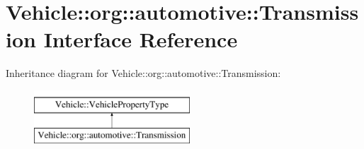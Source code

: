 \hypertarget{interfaceVehicle_1_1org_1_1automotive_1_1Transmission}{\section{Vehicle\-:\-:org\-:\-:automotive\-:\-:Transmission Interface Reference}
\label{interfaceVehicle_1_1org_1_1automotive_1_1Transmission}
}
Inheritance diagram for Vehicle\-:\-:org\-:\-:automotive\-:\-:Transmission\-:\begin{figure}[H]
\begin{center}
\leavevmode
\includegraphics[height=2.000000cm]{interfaceVehicle_1_1org_1_1automotive_1_1Transmission}
\end{center}
\end{figure}
